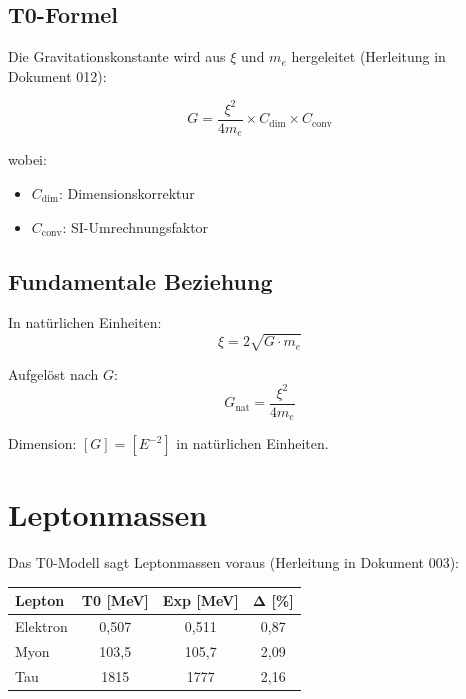	\subsection{T0-Formel}
	
	Die Gravitationskonstante wird aus $\xi$ und $m_e$ hergeleitet (Herleitung in Dokument 012):
	
	\begin{equation}
		G = \frac{\xi^2}{4m_e} \times C_{\text{dim}} \times C_{\text{conv}}
		\label{eq:G_formula}
	\end{equation}
	
	wobei:
	\begin{itemize}
		\item $C_{\text{dim}}$: Dimensionskorrektur
		\item $C_{\text{conv}}$: SI-Umrechnungsfaktor
	\end{itemize}
	
	\subsection{Fundamentale Beziehung}
	
	In natürlichen Einheiten:
	\begin{equation}
		\xi = 2\sqrt{G \cdot m_e}
	\end{equation}
	
	Aufgelöst nach $G$:
	\begin{equation}
		G_{\text{nat}} = \frac{\xi^2}{4m_e}
	\end{equation}
	
	Dimension: $[G] = [E^{-2}]$ in natürlichen Einheiten.
	
	\section{Leptonmassen}
	\label{sec:lepton_masses}
	
	Das T0-Modell sagt Leptonmassen voraus (Herleitung in Dokument 003):
	
	\begin{table}[h]
		\centering
		\begin{tabular}{lccc}
			\hline
			\textbf{Lepton} & \textbf{T0 [MeV]} & \textbf{Exp [MeV]} & \textbf{Δ [\%]} \\
			\hline
			Elektron & 0,507 & 0,511 & 0,87 \\
			Myon & 103,5 & 105,7 & 2,09 \\
			Tau & 1815 & 1777 & 2,16 \\
			\hline
		\end{tabular}
	\end{table}
	
